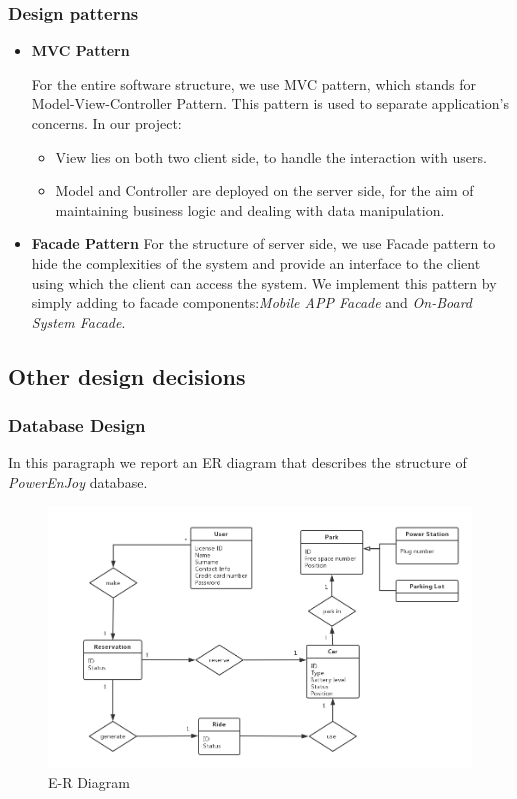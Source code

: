 \documentclass[a4paper,11pt]{article}
\begin{document}
		\subsubsection{Design patterns}
			\begin{itemize}
				\item \textbf{MVC Pattern}
				
					For the entire software structure, we use MVC pattern, which stands for Model-View-Controller Pattern. This pattern is used to separate application's concerns. In our project:
					\begin{itemize}
						\item View lies on both two client side, to handle the interaction with users.
						\item Model and Controller are deployed on the server side, for the aim of maintaining business logic and dealing with data manipulation. 
					\end{itemize}
				
				\item \textbf{Facade Pattern}
					For the structure of server side, we use Facade pattern to hide the complexities of the system and provide an interface to the client using which the client can access the system. We implement this pattern by simply adding to facade components:\textsl{Mobile APP Facade} and \textsl{On-Board System Facade}.
					
			\end{itemize}
		
	\subsection{Other design decisions}
	\subsubsection{Database Design}
	In this paragraph we report an ER diagram that describes the structure of \textsl{PowerEnJoy} database.
	\begin{figure}[H]
   			\centering
   			\includegraphics[width=\textwidth]{images/ER}
  	    		\caption{E-R Diagram}\label{fig-ER}
		\end{figure}
\end{document}
